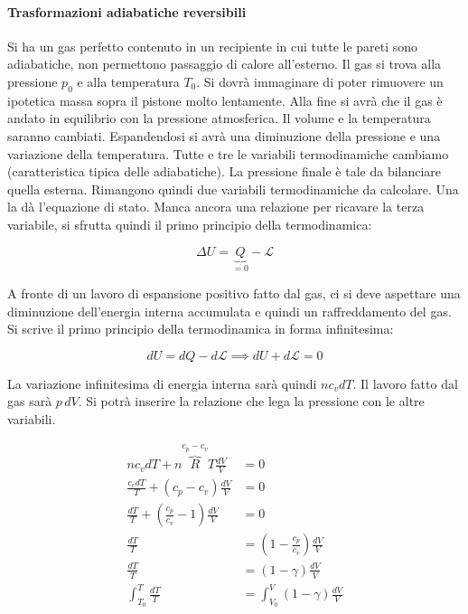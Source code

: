 \paragraph{Trasformazioni adiabatiche reversibili} Si ha un gas perfetto contenuto in un recipiente in cui tutte le pareti sono adiabatiche, non permettono passaggio di calore all'esterno. Il gas si trova alla pressione $p_0$ e alla temperatura $T_0$. Si dovrà immaginare di poter rimuovere un ipotetica massa sopra il pistone molto lentamente. Alla fine si avrà che il gas è andato in equilibrio con la pressione atmosferica. Il volume e la temperatura saranno cambiati. Espandendosi si avrà una diminuzione della pressione e una variazione della temperatura. Tutte e tre le variabili termodinamiche cambiamo (caratteristica tipica delle adiabatiche). La pressione finale è tale da bilanciare quella esterna. Rimangono quindi due variabili termodinamiche da calcolare. Una la dà l'equazione di stato. Manca ancora una relazione per ricavare la terza variabile, si sfrutta quindi il primo principio della termodinamica:

\[
	\Delta U = \underbrace{Q}_{=0} - \mathcal{L}
\]

A fronte di un lavoro di espansione positivo fatto dal gas, ci si deve aspettare una diminuzione dell'energia interna accumulata e quindi un raffreddamento del gas. Si scrive il primo principio della termodinamica in forma infinitesima:

\[
	dU = dQ - d\mathcal{L}  \implies dU + d\mathcal{L} = 0
\]

La variazione infinitesima di energia interna sarà quindi $n c_v dT$. Il lavoro fatto dal gas sarà $p\,dV$. Si potrà inserire la relazione che lega la pressione con le altre variabili.

\begin{align*}
	n c_v dT + n\overbrace{R}^{c_p-c_v}T \frac{dV}{V} &= 0 \\
	\frac{c_v dT}{T} + (c_p-c_v)\frac{dV}{V} &= 0 \tag*{dividendo per $nT$} \\
	\frac{dT}{T} + \left(\frac{c_p}{c_v}-1\right)\frac{dV}{V} &= 0 \tag*{dividendo per $c_v$}\\
	\frac{dT}{T} &= \left( 1-\frac{c_p }{c_v} \right) \frac{dV}{V} \\
	\frac{dT}{T} &= \left( 1- \gamma \right) \frac{dV}{V} \\
	\int_{T_0 }^T \frac{dT}{T} &= \int_{V_0 }^V \left( 1- \gamma \right) \frac{dV}{V} \tag*{integrando}\\
\end{align*}

